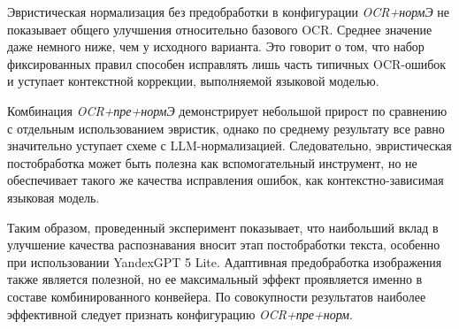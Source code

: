 Эвристическая нормализация без предобработки в конфигурации \textit{OCR+нормЭ} не показывает общего улучшения относительно базового OCR. Среднее значение даже немного ниже, чем у исходного варианта. Это говорит о том, что набор фиксированных правил способен исправлять лишь часть типичных OCR-ошибок и уступает контекстной коррекции, выполняемой языковой моделью.

Комбинация \textit{OCR+пре+нормЭ} демонстрирует небольшой прирост по сравнению с отдельным использованием эвристик, однако по среднему результату все равно значительно уступает схеме с LLM-нормализацией. Следовательно, эвристическая постобработка может быть полезна как вспомогательный инструмент, но не обеспечивает такого же качества исправления ошибок, как контекстно-зависимая языковая модель.

Таким образом, проведенный эксперимент показывает, что наибольший вклад в улучшение качества распознавания вносит этап постобработки текста, особенно при использовании YandexGPT 5 Lite. Адаптивная предобработка изображения также является полезной, но ее максимальный эффект проявляется именно в составе комбинированного конвейера. По совокупности результатов наиболее эффективной следует признать конфигурацию \textit{OCR+пре+норм}.